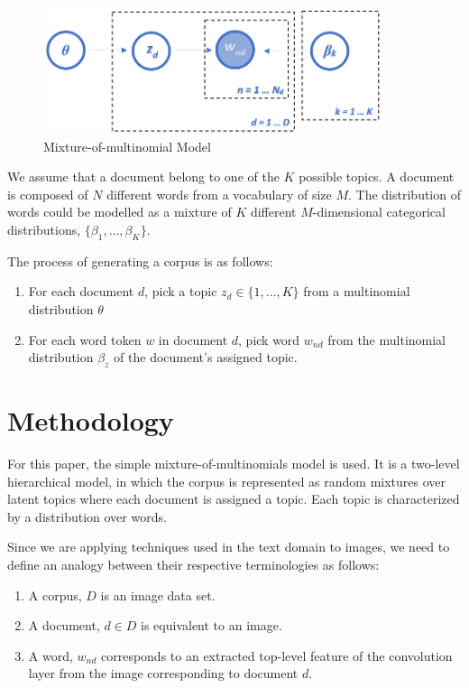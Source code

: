\documentclass{article}
\begin{document}
\begin{figure}[]
  \centering
  \includegraphics[width=10cm]{CMM.png}
  \caption{Mixture-of-multinomial Model}
  \label{CMM}
\end{figure}

We assume that a document belong to one of the $K$ possible topics. A document is composed of $N$ different words from a vocabulary of size $M$. The distribution of words could be modelled as a mixture of $K$ different $M$-dimensional categorical distributions, $\{\beta_1,\ldots,\beta_K\}$. 

The process of generating a corpus is as follows:
\begin{enumerate}
    \item For each document $d$, pick a topic $z_d \in \{1,\ldots, K\}$ from a multinomial distribution $\theta$ 
    \item For each word token $w$ in document $d$, pick word $w_{nd}$ from the multinomial distribution $\beta_z$ of the document's assigned topic.
\end{enumerate}



\section{Methodology}
For this paper, the simple mixture-of-multinomials model is used. It is a two-level hierarchical model, in which the corpus is represented as random mixtures over latent topics where each document is assigned a topic. Each topic is characterized by a distribution over words. 

Since we are applying techniques used in the text domain to images, we need to define an analogy between their respective terminologies as follows:
\begin{enumerate}
    \item A corpus, $D$ is an image data set.
    \item A document, $d \in D$ is equivalent to an image.
    \item A word, $w_{nd}$ corresponds to an extracted top-level feature of the convolution layer from the image corresponding to document $d$.
\end{enumerate}
\end{document}
